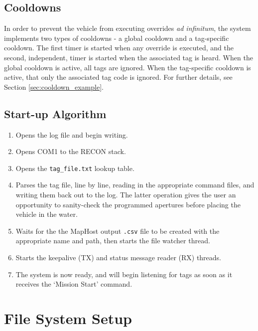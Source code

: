 \documentclass[11pt]{article} %
\begin{document}
\subsection{Cooldowns}
\label{sec:cooldowns}
In order to prevent the vehicle from executing overrides \textit{ad infinitum}, the system implements two types of cooldowns - a global cooldown and
a tag-specific cooldown. The first timer is started when any override is executed, and the second, independent, timer is started when the associated tag is heard. When the global
cooldown is active, all tags are ignored. When the tag-specific cooldown is active, that only the associated tag code is ignored. 
For further details, see Section \ref{sec:cooldown_example}.

\subsection{Start-up Algorithm}
\begin{enumerate}
\item Opens the log file and begin writing.
\item Opens COM1 to the RECON stack.
\item Opens the \texttt{tag\_file.txt} lookup table.
\item Parses the tag file, line by line, reading in the appropriate command files, and writing them back out to the log. The latter operation gives the 
	user an opportunity to sanity-check the programmed apertures before placing the vehicle in the water.
\item Waits for the the MapHost output \texttt{.csv} file to be created with the appropriate name and path, then starts the file watcher thread.
\item Starts the keepalive (TX) and status message reader (RX) threads.
\item The system is now ready, and will begin listening for tags as soon as it receives the `Mission Start' command.
\end{enumerate}




\section{File System Setup}
\label{sec:filesystem}
\end{document}
